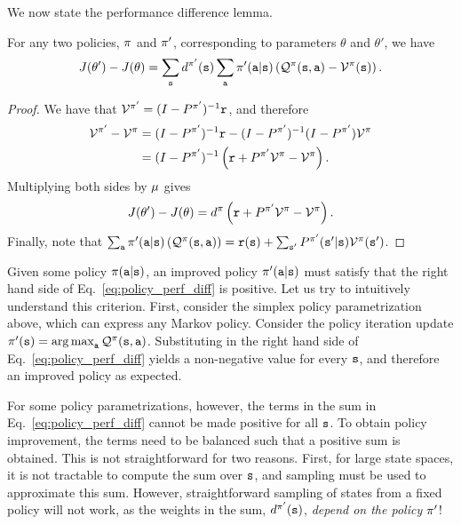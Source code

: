 We now state the performance difference lemma.
\begin{lemma}\label{lemma:perf_diff}
    For any two policies, $\pi$ and $\pi'$, corresponding to parameters $\theta$ and $\theta'$, we have
    \begin{equation}\label{eq:policy_perf_diff}
        J(\theta') - J(\theta)= \sum_{{\tt s}} d^{\pi'}({\tt s}) \sum_{\tt a} \pi'({\tt a}|{\tt s})\left( \mathcal{Q}^{\pi}({\tt s},{\tt a}) - \mathcal{V}^{\pi}({\tt s})\right).
    \end{equation}
\end{lemma}
\begin{proof}
    We have that $\mathcal{V}^{\pi'} = (I - P^{\pi'})^{-1}{\tt r}$, and therefore
    \begin{equation*}
    \begin{split}
        \mathcal{V}^{\pi'} - \mathcal{V}^\pi &= (I - P^{\pi'})^{-1}{\tt r} - (I - P^{\pi'})^{-1} (I - P^{\pi'}) \mathcal{V}^\pi \\
        &=(I - P^{\pi'})^{-1} \left({\tt r} +P^{\pi'}\mathcal{V}^\pi - \mathcal{V}^\pi \right).
    \end{split}
    \end{equation*}
    Multiplying both sides by $\mu$ gives
    \begin{equation*}
        J(\theta') - J(\theta) = d^{\pi}\left({\tt r} +P^{\pi'}\mathcal{V}^\pi - \mathcal{V}^\pi \right).
    \end{equation*}
    Finally, note that $\sum_{\tt a} \pi'({\tt a}|{\tt s})\left( \mathcal{Q}^{\pi}({\tt s},{\tt a})\right) = {\tt r}({\tt s}) + \sum_{{\tt s}'}P^{\pi'}({\tt s}'|{\tt s})\mathcal{V}^{\pi}({\tt s}')$.
\end{proof}

Given some policy $\pi({\tt a}|{\tt s})$, an improved policy $\pi'({\tt a}|{\tt s})$ must satisfy that the right hand side of Eq.~\ref{eq:policy_perf_diff} is positive.
Let us try to intuitively understand this criterion. First, consider the simplex policy parametrization above, which can express any Markov policy.  Consider the policy iteration update $\policy'(\state) = \argmax_{\action} \QValue^{\policy}(\state,\action)$. Substituting in the right hand side of Eq.~\ref{eq:policy_perf_diff} yields a non-negative value for every ${\tt s}$, and therefore an improved policy as expected.

For some policy parametrizations, however, the terms in the sum in Eq.~\ref{eq:policy_perf_diff} cannot be made positive for all ${\tt s}$. To obtain policy improvement, the terms need to be balanced such that a positive sum is obtained. This is not straightforward for two reasons. First, for large state spaces, it is not tractable to compute the sum over ${\tt s}$, and sampling must be used to approximate this sum. However, straightforward sampling of states from a fixed policy will not work, as the weights in the sum, $d^{\pi'}({\tt s})$, \textit{depend on the policy $\pi'$}! 

